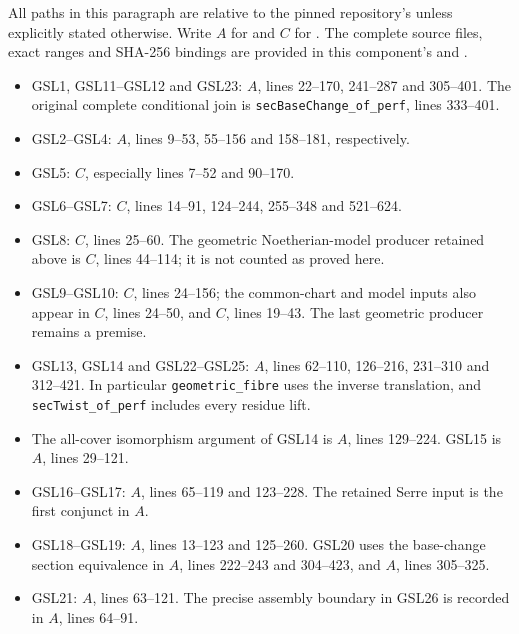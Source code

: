 {\small\raggedright
All paths in this paragraph are relative to the pinned repository's
 unless explicitly
stated otherwise.  Write $A$ for
 and $C$ for
.  The complete source files,
exact ranges and SHA-256 bindings are provided in this component's
 and .

\begin{itemize}
 \item GSL1, GSL11--GSL12 and GSL23:
 $A$, lines 22--170,
 241--287 and 305--401.  The original complete conditional
 join is \texttt{secBaseChange\_of\_perf}, lines 333--401.
 \item GSL2--GSL4:
 $A$,
 lines 9--53, 55--156 and 158--181, respectively.
 \item GSL5:
 $C$,
 especially lines 7--52 and 90--170.
 \item GSL6--GSL7:
 $C$,
 lines 14--91, 124--244, 255--348 and 521--624.
 \item GSL8:
 $C$,
 lines 25--60.  The geometric Noetherian-model producer retained
 above is $C$,
 lines 44--114; it is not counted as proved here.
 \item GSL9--GSL10:
 $C$,
 lines 24--156; the common-chart and model inputs also appear in
 $C$,
 lines 24--50, and
 $C$,
 lines 19--43.  The last geometric producer remains a premise.
 \item GSL13, GSL14 and GSL22--GSL25:
 $A$, lines 62--110,
 126--216, 231--310 and 312--421.  In particular
 \texttt{geometric\_fibre} uses the inverse translation,
 and \texttt{secTwist\_of\_perf} includes every residue lift.
 \item The all-cover isomorphism argument of GSL14 is
 $A$,
 lines 129--224.  GSL15 is
 $A$, lines 29--121.
 \item GSL16--GSL17:
 $A$,
 lines 65--119 and 123--228.  The retained Serre input is the
 first conjunct in
 $A$.
 \item GSL18--GSL19:
 $A$,
 lines 13--123 and 125--260.  GSL20 uses the base-change
 section equivalence in
 $A$,
 lines 222--243 and 304--423, and
 $A$, lines 305--325.
 \item GSL21:
 $A$, lines 63--121.
 The precise assembly boundary in GSL26 is recorded in
 $A$, lines 64--91.
\end{itemize}

}
